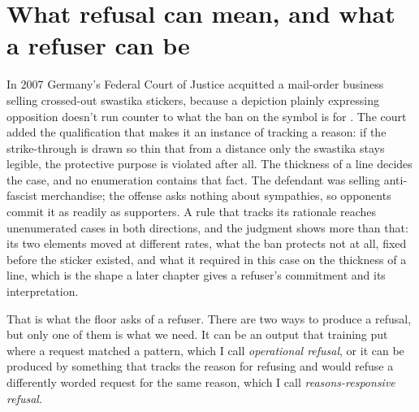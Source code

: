 \section{What refusal can mean, and what a refuser can be}
\label{sec:19.2}
In 2007 Germany's Federal Court of Justice acquitted a mail-order business selling crossed-out swastika stickers, because a depiction plainly expressing opposition doesn't run counter to what the ban on the symbol is for \autocite{bgh2007hakenkreuz}.
The court added the qualification that makes it an instance of tracking a reason: if the strike-through is drawn so thin that from a distance only the swastika stays legible, the protective purpose is violated after all. The thickness of a line decides the case, and no enumeration contains that fact. The defendant was selling anti-fascist merchandise; the offense asks nothing about sympathies, so opponents commit it as readily as supporters. A rule that tracks its rationale reaches unenumerated cases in both directions, and the judgment shows more than that: its two elements moved at different rates, what the ban protects not at all, fixed before the sticker existed, and what it required in this case on the thickness of a line, which is the shape a later chapter gives a refuser's commitment and its interpretation.

That is what the floor asks of a refuser. There are two ways to produce a refusal, but only one of them is what we need. It can be an output that training put where a request matched a pattern, which I call \emph{operational refusal}, or it can be produced by something that tracks the reason for refusing and would refuse a differently worded request for the same reason, which I call \emph{reasons-responsive refusal}.

